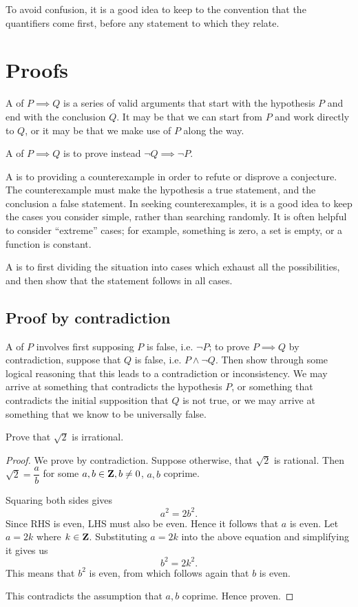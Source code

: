 \begin{remark}
To avoid confusion, it is a good idea to keep to the convention that the quantifiers come first, before any statement to which they relate.
\end{remark}
\pagebreak

\section{Proofs}
A  of $P \implies Q$ is a series of valid arguments that start with the hypothesis $P$ and end with the conclusion $Q$. It may be that we can start from $P$ and work directly to $Q$, or it may be that we make use of $P$ along the way.

A  of $P \implies Q$ is to prove instead $\lnot Q \implies \lnot P$.

A  is to providing a counterexample in order to refute or disprove a conjecture. The counterexample must make the hypothesis a true statement, and the conclusion a false statement. In seeking counterexamples, it is a good idea to keep the cases you consider simple, rather than searching randomly. It is often helpful to consider ``extreme'' cases; for example, something is zero, a set is empty, or a function is constant.

A  is to first dividing the situation into cases which exhaust all the possibilities, and then show that the statement follows in all cases.

\subsection{Proof by contradiction}
A  of $P$ involves first supposing $P$ is false, i.e. $\lnot P$; to prove $P \implies Q$ by contradiction, suppose that $Q$ is false, i.e. $P\land\lnot Q$. Then show through some logical reasoning that this leads to a contradiction or inconsistency. We may arrive at something that contradicts the hypothesis $P$, or something that contradicts the initial supposition that $Q$ is not true, or we may arrive at something that we know to be universally false.

\begin{exercise}
Prove that $\sqrt{2}$ is irrational.
\end{exercise}
\begin{proof}
We prove by contradiction. Suppose otherwise, that $\sqrt{2}$ is rational. Then $\sqrt{2}=\dfrac{a}{b}$ for some $a,b\in\mathbf Z,b\neq 0$, $a,b$ coprime.

Squaring both sides gives
\[a^2=2b^2.\]
Since RHS is even, LHS must also be even. Hence it follows that $a$ is even. Let $a=2k$ where $k\in\mathbf Z$. Substituting $a = 2k$ into the above equation and simplifying it gives us
\[b^2=2k^2.\]
This means that $b^2$ is even, from which follows again that $b$ is even. 

This contradicts the assumption that $a,b$ coprime. Hence proven.
\end{proof}

